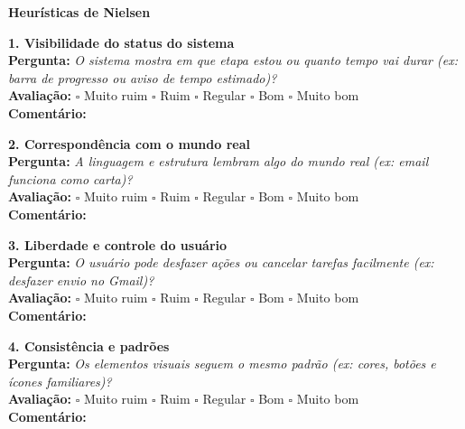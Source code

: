 \textbf{Heurísticas de Nielsen}

\textbf{1. Visibilidade do status do sistema} \\
\textbf{Pergunta:} \textit{O sistema mostra em que etapa estou ou quanto tempo vai durar (ex: barra de progresso ou aviso de tempo estimado)?} \\
\textbf{Avaliação:} $\square$ Muito ruim \hspace{0.5cm} $\square$ Ruim \hspace{0.5cm} $\square$ Regular \hspace{0.5cm} $\square$ Bom \hspace{0.5cm} $\square$ Muito bom \\
\textbf{Comentário:} \underline{\hspace{12cm}}

\textbf{2. Correspondência com o mundo real} \\
\textbf{Pergunta:} \textit{A linguagem e estrutura lembram algo do mundo real (ex: email funciona como carta)?} \\
\textbf{Avaliação:} $\square$ Muito ruim \hspace{0.5cm} $\square$ Ruim \hspace{0.5cm} $\square$ Regular \hspace{0.5cm} $\square$ Bom \hspace{0.5cm} $\square$ Muito bom \\
\textbf{Comentário:} \underline{\hspace{12cm}}

\textbf{3. Liberdade e controle do usuário} \\
\textbf{Pergunta:} \textit{O usuário pode desfazer ações ou cancelar tarefas facilmente (ex: desfazer envio no Gmail)?} \\
\textbf{Avaliação:} $\square$ Muito ruim \hspace{0.5cm} $\square$ Ruim \hspace{0.5cm} $\square$ Regular \hspace{0.5cm} $\square$ Bom \hspace{0.5cm} $\square$ Muito bom \\
\textbf{Comentário:} \underline{\hspace{12cm}}

\textbf{4. Consistência e padrões} \\
\textbf{Pergunta:} \textit{Os elementos visuais seguem o mesmo padrão (ex: cores, botões e ícones familiares)?} \\
\textbf{Avaliação:} $\square$ Muito ruim \hspace{0.5cm} $\square$ Ruim \hspace{0.5cm} $\square$ Regular \hspace{0.5cm} $\square$ Bom \hspace{0.5cm} $\square$ Muito bom \\
\textbf{Comentário:} \underline{\hspace{12cm}}

